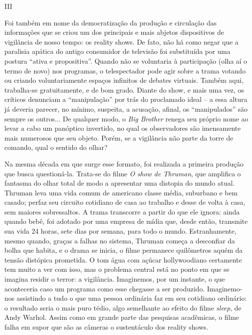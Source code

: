 \begin{center}
III
\end{center}

Foi também em nome da democratização da produção e circulação das
informações que se criou um dos principais e mais abjetos dispositivos
de vigilância de nosso tempo: os reality shows. De fato, não há como
negar que a paralisia apática do antigo consumidor de televisão foi
substituída por uma postura ``ativa e propositiva''. Quando não se
voluntaria à participação (olha aí o termo de novo) nos programas, o
telespectador pode agir sobre a trama votando ou criando voluntariamente
espaços infinitos de debates virtuais. Também aqui, trabalha-se
gratuitamente, e de bom grado. Diante do show, e mais uma vez, os
críticos denunciam a ``manipulação'' por trás do proclamado ideal -- a
essa altura já deveria parecer, no mínimo, suspeita, a acusação, afinal,
os ``manipulados'' são sempre os outros... De qualquer modo, o \emph{Big
Brother} renega seu próprio nome ao levar a cabo um panóptico invertido,
no qual os observadores são imensamente mais numerosos que seu objeto.
Porém, se a vigilância não parte da torre de comando, qual o sentido do
olhar?

Na mesma década em que surge esse formato, foi realizada a primeira
produção que busca questioná-la. Trata-se do filme \emph{O show de
Thruman}, que amplifica o fantasma do olhar total de modo a apresentar
uma distopia do mundo atual. Thruman leva uma vida comum de americano
classe média, suburbano e bem casado; perfaz seu circuito cotidiano de
casa ao trabalho e desse de volta à casa, sem maiores sobressaltos. A
trama transcorre a partir do que ele ignora: ainda quando bebê, foi
adotado por uma empresa de mídia que, desde então, transmite sua vida 24
horas, sete dias por semana, para todo o mundo. Estranhamente, mesmo
quando, graças a falhas no sistema, Thruman começa a desconfiar da bolha
que habita, e o drama se inicia, o filme permanece quilômetros aquém da
tensão distópica prometida. O tom água com açúcar hollywoodiano
certamente tem muito a ver com isso, mas o problema central está no
ponto em que se imagina residir o terror: a vigilância. Imaginemos, por
um instante, o que aconteceria caso um programa como esse chegasse a ser
produzido. Imaginemo-nos assistindo a tudo o que uma pessoa ordinária
faz em seu cotidiano ordinário: o resultado seria o mais puro tédio,
algo semelhante ao efeito do filme \emph{sleep}, de Andy Warhol. Assim
como em grande parte das pesquisas acadêmicas, o filme falha em supor
que são as câmeras o sustentáculo dos reality shows.

